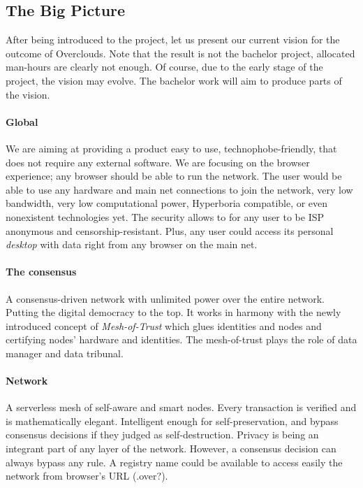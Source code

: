
\subsection{The Big Picture}
After being introduced to the project, let us present our current vision for the outcome of Overclouds. Note that the result is not the bachelor project, allocated man-hours are clearly not enough. Of course, due to the early stage of the project, the vision may evolve. The bachelor work will aim to produce parts of the vision.

\paragraph{Global}
We are aiming at providing a product easy to use, technophobe-friendly, that does not require any external software. We are focusing on the browser experience; any browser should be able to run the network. The user would be able to use any hardware and main net connections to join the network, very low bandwidth, very low computational power, Hyperboria\cite{HypeHyperboriaWhitepaper} compatible, or even nonexistent technologies yet. The security allows to for any user to be ISP anonymous and censorship-resistant. Plus, any user could access its personal \textit{desktop} with data right from any browser on the main net.

\paragraph{The consensus}
A consensus-driven network with unlimited power over the entire network. Putting the digital democracy to the top. It works in harmony with the newly introduced concept of \textit{Mesh-of-Trust} which glues identities and nodes and certifying nodes' hardware and identities. The mesh-of-trust plays the role of data manager and data tribunal.

\paragraph{Network}
A serverless mesh of self-aware and smart nodes. Every transaction is verified and is mathematically elegant. Intelligent enough for self-preservation, and bypass consensus decisions if they judged as self-destruction. Privacy is being an integrant part of any layer of the network. However, a consensus decision can always bypass any rule. A registry name could be available to access easily the network from browser's URL (.over?).

